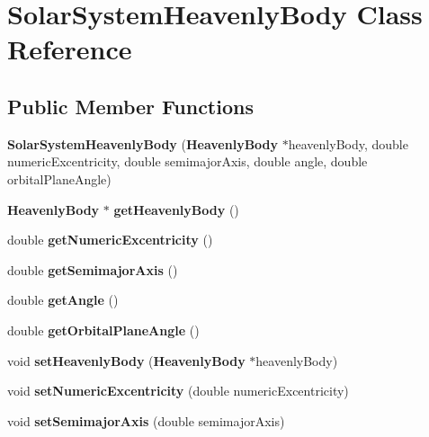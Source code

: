 \section{\-Solar\-System\-Heavenly\-Body \-Class \-Reference}
\label{d9/dbe/classSolarSystemHeavenlyBody}
\subsection*{\-Public \-Member \-Functions}
\begin{DoxyCompactItemize}
\item 
{\bfseries \-Solar\-System\-Heavenly\-Body} ({\bf \-Heavenly\-Body} $\ast$heavenly\-Body, double numeric\-Excentricity, double semimajor\-Axis, double angle, double orbital\-Plane\-Angle)\label{d9/dbe/classSolarSystemHeavenlyBody_a384412cc2adffbec84337aa361519fc6}

\item 
{\bf \-Heavenly\-Body} $\ast$ {\bfseries get\-Heavenly\-Body} ()\label{d9/dbe/classSolarSystemHeavenlyBody_af9c4f74bf3ea02dea8800cb013eaf878}

\item 
double {\bfseries get\-Numeric\-Excentricity} ()\label{d9/dbe/classSolarSystemHeavenlyBody_ada30a53ecb21376f2e1d16d372b273a4}

\item 
double {\bfseries get\-Semimajor\-Axis} ()\label{d9/dbe/classSolarSystemHeavenlyBody_acdec4ef29103730c575c1f9ec33a8438}

\item 
double {\bfseries get\-Angle} ()\label{d9/dbe/classSolarSystemHeavenlyBody_a91dffb8bfe392257048bc689f13528ce}

\item 
double {\bfseries get\-Orbital\-Plane\-Angle} ()\label{d9/dbe/classSolarSystemHeavenlyBody_a498b595f26b3e4086f81ba76d1e2908c}

\item 
void {\bfseries set\-Heavenly\-Body} ({\bf \-Heavenly\-Body} $\ast$heavenly\-Body)\label{d9/dbe/classSolarSystemHeavenlyBody_af9203ede3fa3e3b80679e88e50e4237a}

\item 
void {\bfseries set\-Numeric\-Excentricity} (double numeric\-Excentricity)\label{d9/dbe/classSolarSystemHeavenlyBody_ac6d51045bf0ae5bd676a31f310f757bf}

\item 
void {\bfseries set\-Semimajor\-Axis} (double semimajor\-Axis)\label{d9/dbe/classSolarSystemHeavenlyBody_a009c8b119d34d6f8654b3452d8fbd464}


\end{DoxyCompactItemize}
